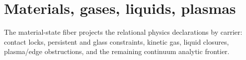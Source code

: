 \section{Materials, gases, liquids, plasmas}

The material-state fiber projects the relational physics declarations by
carrier: contact locks, persistent and glass constraints, kinetic gas,
liquid closures, plasma/edge obstructions, and the remaining continuum
analytic frontier.









